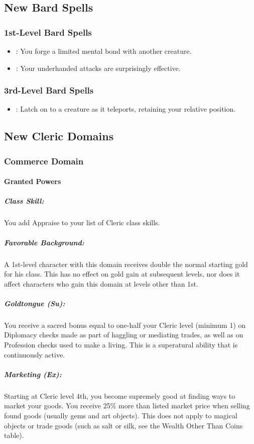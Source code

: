 \subsection{New Bard Spells}
\subsubsection{1st-Level Bard Spells}
\begin{itemize}
 \item {}: You forge a limited mental bond with another creature.
 \item {}: Your underhanded attacks are surprisingly effective.
\end{itemize}
\subsubsection{3rd-Level Bard Spells}
\begin{itemize}
 \item {}: Latch on to a creature as it teleports, retaining your relative position.
\end{itemize}

\subsection{New Cleric Domains}
\label{sec:NewClericDomains}
\subsubsection{Commerce Domain}
\label{sec:CommerceDomain}
\paragraph{Granted Powers}
\subparagraph{Class Skill:}
You add Appraise to your list of Cleric class skills.
\subparagraph{Favorable Background:} A 1st-level character with this domain receives double the normal starting gold for his class. This has no effect on gold gain at subsequent levels, nor does it affect characters who gain this domain at levels other than 1st.
\subparagraph{Goldtongue (Su):}
You receive a sacred bonus equal to one-half your Cleric level (minimum 1) on Diplomacy checks made as part of haggling or mediating trades, as well as on Profession checks used to make a living.
This is a superatural ability that is continuously active.
\subparagraph{Marketing (Ex):}
Starting at Cleric level 4th, you become supremely good at finding ways to market your goods. You receive 25\% more than listed market price when selling found goods (usually gems and art objects). This does not apply to magical objects or trade goods (such as salt or silk, see the Wealth Other Than Coins table).


